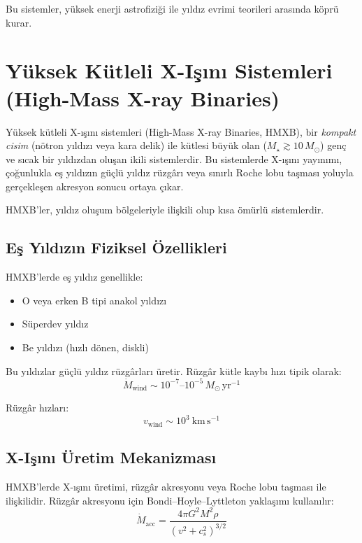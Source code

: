 Bu sistemler, yüksek enerji astrofiziği ile yıldız evrimi teorileri arasında köprü kurar.

\section{Yüksek Kütleli X-Işını Sistemleri (High-Mass X-ray Binaries)}

Yüksek kütleli X-ışını sistemleri (High-Mass X-ray Binaries, HMXB), bir \emph{kompakt cisim} (nötron yıldızı veya kara delik) ile kütlesi büyük olan ($M_\star \gtrsim 10\,M_\odot$) genç ve sıcak bir yıldızdan oluşan ikili sistemlerdir. Bu sistemlerde X-ışını yayınımı, çoğunlukla eş yıldızın güçlü yıldız rüzgârı veya sınırlı Roche lobu taşması yoluyla gerçekleşen akresyon sonucu ortaya çıkar.

HMXB'ler, yıldız oluşum bölgeleriyle ilişkili olup kısa ömürlü sistemlerdir.

\subsection{Eş Yıldızın Fiziksel Özellikleri}

HMXB'lerde eş yıldız genellikle:
\begin{itemize}
    \item O veya erken B tipi anakol yıldızı
    \item Süperdev yıldız
    \item Be yıldızı (hızlı dönen, diskli)
\end{itemize}

Bu yıldızlar güçlü yıldız rüzgârları üretir. Rüzgâr kütle kaybı hızı tipik olarak:
\begin{equation}
\dot{M}_{\mathrm{wind}} \sim 10^{-7} \text{--} 10^{-5}\, M_\odot\,\mathrm{yr^{-1}}
\end{equation}

Rüzgâr hızları:
\begin{equation}
v_{\mathrm{wind}} \sim 10^3\ \mathrm{km\,s^{-1}}
\end{equation}

\subsection{X-Işını Üretim Mekanizması}

HMXB'lerde X-ışını üretimi, rüzgâr akresyonu veya Roche lobu taşması ile ilişkilidir. Rüzgâr akresyonu için Bondi–Hoyle–Lyttleton yaklaşımı kullanılır:
\begin{equation}
\dot{M}_{\mathrm{acc}} = \frac{4\pi G^2 M^2 \rho}{(v^2 + c_s^2)^{3/2}}
\end{equation}

